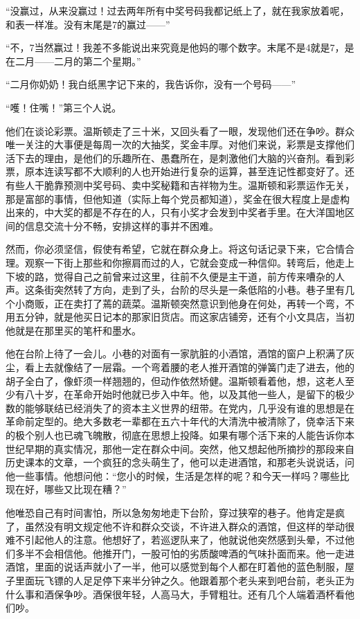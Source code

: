``没赢过，从来没赢过！过去两年所有中奖号码我都记纸上了，就在我家放着呢，和表一样准。没有末尾是7的赢过——''

``不，7当然赢过！我差不多能说出来究竟是他妈的哪个数字。末尾不是4就是7，是在二月——二月的第二个星期。''

``二月你奶奶！我白纸黑字记下来的，我告诉你，没有一个号码——''

``嚄！住嘴！''第三个人说。

他们在谈论彩票。温斯顿走了三十米，又回头看了一眼，发现他们还在争吵。群众唯一关注的大事便是每周一次的大抽奖，奖金丰厚。对他们来说，彩票是支撑他们活下去的理由，是他们的乐趣所在、愚蠢所在，是刺激他们大脑的兴奋剂。看到彩票，原本连读写都不大顺利的人也开始进行复杂的运算，甚至连记性都变好了。还有些人干脆靠预测中奖号码、卖中奖秘籍和吉祥物为生。温斯顿和彩票运作无关，那是富部的事情，但他知道（实际上每个党员都知道），奖金在很大程度上是虚构出来的，中大奖的都是不存在的人，只有小奖才会发到中奖者手里。在大洋国地区间的信息交流十分不畅，安排这样的事并不困难。

然而，你必须坚信，假使有希望，它就在群众身上。将这句话记录下来，它合情合理。观察一下街上那些和你擦肩而过的人，它就会变成一种信仰。转弯后，他走上下坡的路，觉得自己之前曾来过这里，往前不久便是主干道，前方传来嘈杂的人声。这条街突然转了方向，走到了头，台阶的尽头是一条低陷的小巷。巷子里有几个小商贩，正在卖打了蔫的蔬菜。温斯顿突然意识到他身在何处，再转一个弯，不用五分钟，就是他买日记本的那家旧货店。而这家店铺旁，还有个小文具店，当初他就是在那里买的笔杆和墨水。

他在台阶上待了一会儿。小巷的对面有一家肮脏的小酒馆，酒馆的窗户上积满了灰尘，看上去就像结了一层霜。一个弯着腰的老人推开酒馆的弹簧门走了进去，他的胡子全白了，像虾须一样翘翘的，但动作依然矫健。温斯顿看着他，想，这老人至少有八十岁，在革命开始时他就已步入中年。他，以及其他一些人，是留下的极少数的能够联结已经消失了的资本主义世界的纽带。在党内，几乎没有谁的思想是在革命前定型的。绝大多数老一辈都在五六十年代的大清洗中被清除了，侥幸活下来的极个别人也已魂飞魄散，彻底在思想上投降。如果有哪个活下来的人能告诉你本世纪早期的真实情况，那他一定在群众中间。突然，他又想起他所摘抄的那段来自历史课本的文章，一个疯狂的念头萌生了，他可以走进酒馆，和那老头说说话，问他一些事情。他想问他：``您小的时候，生活是怎样的呢？和今天一样吗？哪些比现在好，哪些又比现在糟？''

他唯恐自己有时间害怕，所以急匆匆地走下台阶，穿过狭窄的巷子。他肯定是疯了，虽然没有明文规定他不许和群众交谈，不许进入群众的酒馆，但这样的举动很难不引起他人的注意。他想好了，若巡逻队来了，他就说他突然感到头晕，不过他们多半不会相信他。他推开门，一股可怕的劣质酸啤酒的气味扑面而来。他一走进酒馆，里面的说话声就小了一半，他可以感觉到每个人都在盯着他的蓝色制服，屋子里面玩飞镖的人足足停下来半分钟之久。他跟着那个老头来到吧台前，老头正为什么事和酒保争吵。酒保很年轻，人高马大，手臂粗壮。还有几个人端着酒杯看他们吵。

